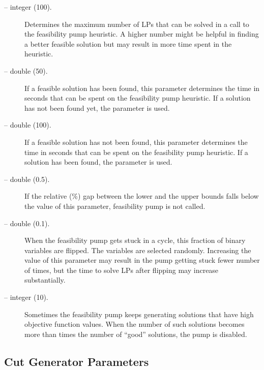 \begin{description}
\item[ -- integer (100).] 
Determines the maximum number of LPs that can be solved in a call to the
feasibility pump heuristic. A higher number might be helpful in finding a
better feasible solution but may result in more time spent in the heuristic.

\item[ -- double (50).] 
If a feasible solution has been found, this parameter determines the time in
seconds that can be spent on the feasibility pump heuristic. If a solution has
not been found yet, the parameter  is used.

\item[ -- double (100).] 
If a feasible solution has not been found, this parameter determines the time in
seconds that can be spent on the feasibility pump heuristic. If a solution has
been found, the parameter  is used.

\item[ -- double (0.5).] 
If the relative (\%) gap between the lower and the upper bounds falls below the
value of this parameter, feasibility pump is not called.

\item[ -- double (0.1).] 
When the feasibility pump gets stuck in a cycle, this fraction of binary
variables are flipped. The variables are selected randomly. Increasing the
value of this parameter may result in the pump getting stuck fewer number of
times, but the time to solve LPs after flipping may increase substantially.

\item[ -- integer (10).] 
Sometimes the feasibility pump keeps generating solutions that have high
objective function values. When the number of such solutions becomes more than
 times the number of ``good'' solutions, the pump
is disabled.

\end{description}
\subsection{Cut Generator Parameters}

